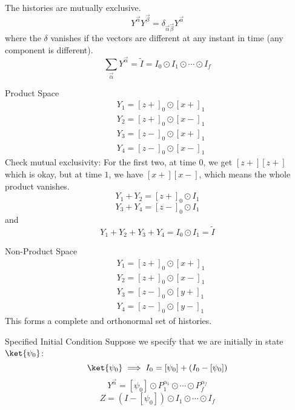 \documentclass[a4paper,twoside,master.tex]{subfiles}
\begin{document}
The histories are mutually exclusive.
\begin{equation}
  Y^{\vec{\alpha}}Y^{\vec{\beta}} = \delta_{\vec{\alpha}\vec{\beta}}Y^{\vec{\alpha}}
\end{equation}
where the $\delta$ vanishes if the vectors are different at any instant in time (any component is different).
\begin{equation}
  \sum_{\vec{\alpha}} Y^{\vec{\alpha}} = \tilde{I} = I_0\odot I_1\odot\cdots\odot I_f
\end{equation}
\begin{ex}
    Product Space
\begin{align}
  &Y_1 = [z+]_0\odot[x+]_1\\
  &Y_2 = [z+]_0\odot[x-]_1\\
  &Y_3 = [z-]_0\odot[x+]_1\\
  &Y_4 = [z-]_0\odot[x-]_1
\end{align}
Check mutual exclusivity: For the first two, at time $0$, we get $[z+][z+]$ which is okay, but at time $1$, we have $[x+][x-]$, which means the whole product vanishes.
\begin{equation}
  Y_1+Y_2 = [z+]_0\odot I_1
\end{equation}
\begin{equation}
  Y_3+Y_4 = [z-]_0\odot I_1
\end{equation}
and
\begin{equation}
  Y_1+Y_2+Y_3+Y_4 = I_0\odot I_1 = \tilde{I}
\end{equation}
\end{ex}
\begin{ex}
    Non-Product Space
\begin{align}
  &Y_1 = [z+]_0\odot[x+]_1\\
  &Y_2 = [z+]_0\odot[x-]_1\\
  &Y_3 = [z-]_0\odot[y+]_1\\
  &Y_4 = [z-]_0\odot[y-]_1
\end{align}
This forms a complete and orthonormal set of histories.
\end{ex}
\begin{ex}
    Specified Initial Condition
Suppose we specify that we are initially in state $\ket{\psi_0}$:
\begin{equation}
  \ket{\psi_0}\implies I_0 = [\psi_0] + (I_0 - [\psi_0])
\end{equation}
\begin{equation}
  Y^{\vec{\alpha}} = [\psi_0]\odot P_1^{\alpha_1}\odot\cdots\odot P_f^{\alpha_f}
\end{equation}
\begin{equation}
  Z = (I-[\psi_0])\odot I_1\odot\cdots\odot I_f
\end{equation}
\end{ex}
\end{document}
